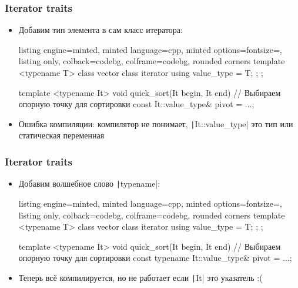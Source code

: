 \documentclass[10pt]{beamer}
\begin{document}
\begin{frame}[fragile]
\frametitle{Iterator traits}
\begin{itemize}
\item Добавим тип элемента в сам класс итератора:
\begin{tcblisting}{listing engine=minted, minted language=cpp, minted options={fontsize=\scriptsize}, listing only, colback=codebg, colframe=codebg, rounded corners}
template <typename T>
class vector {
  class iterator {
    using value_type = T;
  };
};

template <typename It>
void quick_sort(It begin, It end)
{
  // Выбираем опорную точку для сортировки
  const It::value_type& pivot = ...;
}
\end{tcblisting}
\pause
{}
\item Ошибка компиляции: компилятор не понимает, \texttt|It::value_type| это тип или статическая переменная
\end{itemize}
\end{frame}

\begin{frame}[fragile]
\frametitle{Iterator traits}
\begin{itemize}
\item Добавим волшебное слово \texttt|typename|:
\begin{tcblisting}{listing engine=minted, minted language=cpp, minted options={fontsize=\scriptsize}, listing only, colback=codebg, colframe=codebg, rounded corners}
template <typename T>
class vector {
  class iterator {
    using value_type = T;
  };
};

template <typename It>
void quick_sort(It begin, It end)
{
  // Выбираем опорную точку для сортировки
  const typename It::value_type& pivot = ...;
}
\end{tcblisting}
\pause
{}
\item Теперь всё компилируется, но не работает если \texttt|It| это указатель :(
\end{itemize}
\end{frame}
\end{document}
